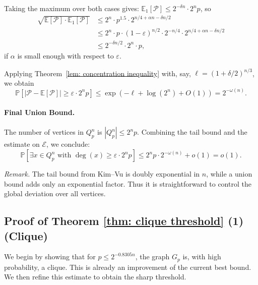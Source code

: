 \documentclass[11pt]{article}
\newcommand{\ep}{\varepsilon}
\theoremstyle{definition}
\theoremstyle{plain}
\begin{document}
Taking the maximum over both cases gives:
\(
\mathbb{E}_1[\mathcal{P}] \leq 2^{-\delta n} \cdot 2^n p\), so 
\begin{align*}
    \sqrt{\mathbb{E}[\mathcal{P}] \cdot \mathbb{E}_1[\mathcal{P}]} &\leq 2^n \cdot p^{1.5} \cdot 2^{n/4 + \alpha n - \delta n/2} \\
    & \leq 2^n\cdot  p \cdot (1-\varepsilon)^{n/2} \cdot 2^{-n/4} \cdot 2^{n/4 + \alpha n - \delta n/2}\\
    & \leq    2^{-\delta n / 2} \cdot 2^n  \cdot p, 
\end{align*}
if  $\alpha$ is small enough with respect to $\ep.$

Applying Theorem~\ref{lem: concentration inequality} with, say, \( \ell = (1 + \delta/2)^{n/3} \), we obtain
\[
\mathbb{P}\left[\left| \mathcal{P} - \mathbb{E}[\mathcal{P}] \right| \geq \varepsilon \cdot 2^n p \right] \leq \exp\left(-\ell + \log(2^n) + O(1)\right) = 2^{-\omega(n)}.
\]


\paragraph{\textbf{Final Union Bound.}}
The number of vertices in \( Q_p^n \) is \( |Q_p^n| \leq 2^n p \). Combining the tail bound and the estimate on \( \mathcal{E} \), we conclude:
\[
\mathbb{P}\left[\exists x \in Q_p^n \text{ with } \deg(x) \geq \varepsilon \cdot 2^n p\right] \leq 2^n p \cdot 2^{-\omega(n)} + o(1) = o(1).
\]

\textit{Remark.} The tail bound from Kim–Vu is doubly exponential in \( n \), while a union bound adds only an exponential factor. Thus it is straightforward to control the global deviation over all vertices.



\subsection{Proof of Theorem \ref{thm: clique threshold} (1) (Clique)}

We begin by showing that for \( p \leq 2^{-0.8305n} \), the graph \( G_p \) is, with high probability, a clique. This is already an improvement of the current best bound. We then refine this estimate to obtain the sharp threshold.
\end{document}
